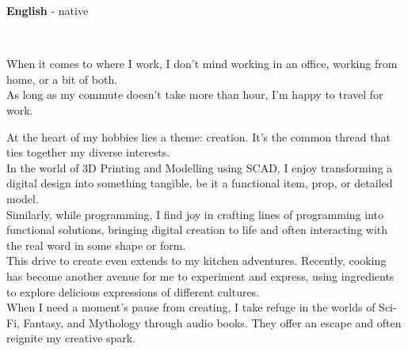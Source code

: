 \documentclass[9pt]{developercv} %
\begin{document}
\begin{minipage}[t]{0.3\textwidth}
	\vspace{-\baselineskip} %

	
	\textbf{English} - native\\


	
	  \\

	\begin{minipage}[t]{0.8\textwidth}
		When it comes to where I work, I don't mind working in an office, working from home, or a bit of both.\\ 

		As long as my commute doesn't take more than hour,  I'm happy to travel for work.
	\end{minipage}
\end{minipage}
\hfill
\begin{minipage}[t]{0.7\textwidth}
	\vspace{-\baselineskip} %
	
	
	At the heart of my hobbies lies a theme: creation. 
	It's the common thread that ties together my diverse interests. \\

	In the world of 3D Printing and Modelling using SCAD, I enjoy transforming a digital design into something tangible, be it a functional item, prop, or detailed model. \\

	Similarly, while programming, I find joy in crafting lines of programming into functional solutions, bringing digital creation to life and often interacting with the real word in some shape or form. \\

	This drive to create even extends to my kitchen adventures. Recently, cooking has become another avenue for me to experiment and express, using ingredients to explore delicious expressions of different cultures.\\

	When I need a moment's pause from creating, I take refuge in the worlds of Sci-Fi, Fantasy, and Mythology through audio books. They offer an escape and often reignite my creative spark.


\end{minipage}
\end{document}
